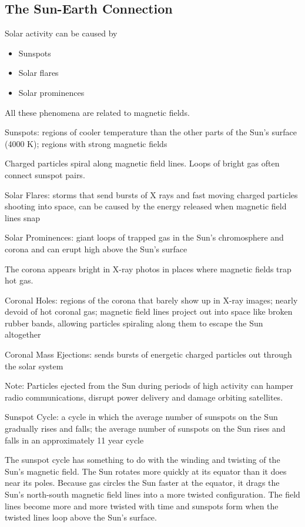 \documentclass[12pt]{article}
\begin{document}
\subsection{The Sun-Earth Connection}
Solar activity can be caused by \begin{itemize} 
\item Sunspots \item Solar flares \item Solar prominences \end{itemize} All these phenomena are related to magnetic fields. 
\begin{definition} Sunspots: regions of cooler temperature than the other parts of the Sun's surface (4000 K); regions with strong magnetic fields \end{definition} 
Charged particles spiral along magnetic field lines. Loops of bright gas often connect sunspot pairs. 
\begin{definition} Solar Flares: storms that send bursts of X rays and fast moving charged particles shooting into space, can be caused by the energy released when magnetic field lines snap \end{definition} 
\begin{definition} Solar Prominences: giant loops of trapped gas in the Sun's chromosphere and corona and can erupt high above the Sun's surface \end{definition} 
The corona appears bright in X-ray photos in places where magnetic fields trap hot gas. 
\begin{definition} Coronal Holes: regions of the corona that barely show up in X-ray images; nearly devoid of hot coronal gas; magnetic field lines project out into space like broken rubber bands, allowing particles spiraling along them to escape the Sun altogether \end{definition}
\begin{definition} Coronal Mass Ejections: sends bursts of energetic charged particles out through the solar system \end{definition} 
Note: Particles ejected from the Sun during periods of high activity can hamper radio communications, disrupt power delivery and damage orbiting satellites. 
\begin{definition} Sunspot Cycle: a cycle in which the average number of sunspots on the Sun gradually rises and falls; the average number of sunspots on the Sun rises and falls in an approximately 11 year cycle \end{definition} 
The sunspot cycle has something to do with the winding and twisting of the Sun's magnetic field. The Sun rotates more quickly at its equator than it does near its poles. Because gas circles the Sun faster at the equator, it drags the Sun's north-south magnetic field lines into a more twisted configuration. The field lines become more and more twisted with time and sunspots form when the twisted lines loop above the Sun's surface. 
\end{document}
